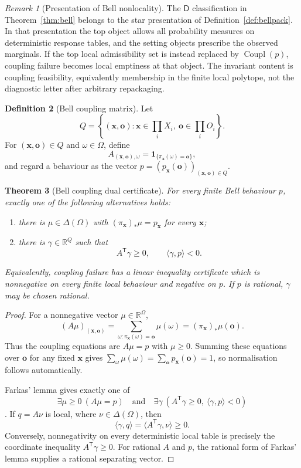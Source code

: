 \documentclass[11pt]{article}
\theoremstyle{plain}
\newtheorem{theorem}{Theorem}[section]
\theoremstyle{definition}
\newtheorem{definition}[theorem]{Definition}
\theoremstyle{remark}
\newtheorem{remark}[theorem]{Remark}
\begin{document}
\begin{remark}[Presentation of Bell nonlocality]
The $\mathsf D$ classification in Theorem~\ref{thm:bell} belongs to the star
presentation of Definition~\ref{def:bellpack}. In that presentation the top
object allows all probability measures on deterministic response tables, and the
setting objects prescribe the observed marginals. If the top local admissibility
set is instead replaced by $\operatorname{Coupl}(p)$, coupling failure becomes
local emptiness at that object. The invariant content is coupling feasibility,
equivalently membership in the finite local polytope, not the diagnostic letter
after arbitrary repackaging.
\end{remark}

\begin{definition}[Bell coupling matrix]\label{def:bell-matrix}
Let
\[
Q=\left\{(\mathbf x,\mathbf o):
\mathbf x\in\prod_iX_i,\ 
\mathbf o\in\prod_iO_i\right\}.
\]
For $(\mathbf x,\mathbf o)\in Q$ and $\omega\in\Omega$, define
\[
A_{(\mathbf x,\mathbf o),\omega}
=\mathbf 1_{\{\pi_{\mathbf x}(\omega)=\mathbf o\}},
\]
and regard a behaviour as the vector
$p=(p_{\mathbf x}(\mathbf o))_{(\mathbf x,\mathbf o)\in Q}$.
\end{definition}

\begin{theorem}[Bell coupling dual certificate]\label{thm:bell-dual}
For every finite Bell behaviour $p$, exactly one of the following alternatives
holds:
\begin{enumerate}[label=(\roman*)]
\item there is $\mu\in\Delta(\Omega)$ with
$(\pi_{\mathbf x})_*\mu=p_{\mathbf x}$ for every $\mathbf x$;
\item there is $\gamma\in\mathbb R^Q$ such that
\[
A^{\mathsf T}\gamma\ge0,
\qquad
\langle\gamma,p\rangle<0.
\]
\end{enumerate}
Equivalently, coupling failure has a linear inequality certificate which is
nonnegative on every finite local behaviour and negative on $p$. If $p$ is
rational, $\gamma$ may be chosen rational.
\end{theorem}

\begin{proof}
For a nonnegative vector $\mu\in\mathbb R^\Omega$,
\[
(A\mu)_{(\mathbf x,\mathbf o)}
=\sum_{\omega:\pi_{\mathbf x}(\omega)=\mathbf o}\mu(\omega)
=(\pi_{\mathbf x})_*\mu(\mathbf o).
\]
Thus the coupling equations are $A\mu=p$ with $\mu\ge0$. Summing these
equations over $\mathbf o$ for any fixed $\mathbf x$ gives
$\sum_\omega\mu(\omega)=\sum_{\mathbf o}p_{\mathbf x}(\mathbf o)=1$, so
normalisation follows automatically.

Farkas' lemma gives exactly one of
\[
\exists\mu\ge0\ (A\mu=p)
\quad\text{and}\quad
\exists\gamma\ (A^{\mathsf T}\gamma\ge0,
\ \langle\gamma,p\rangle<0)
\]
\cite{schrijver}. If $q=A\nu$ is local, where
$\nu\in\Delta(\Omega)$, then
\[
\langle\gamma,q\rangle
=\langle A^{\mathsf T}\gamma,\nu\rangle\ge0.
\]
Conversely, nonnegativity on every deterministic local table is precisely the
coordinate inequality $A^{\mathsf T}\gamma\ge0$. For rational $A$ and $p$, the
rational form of Farkas' lemma supplies a rational separating vector.
\end{proof}
\end{document}
